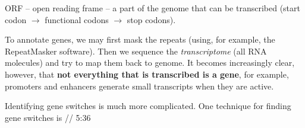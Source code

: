 \documentclass[main.tex]{subfiles}
\begin{document}
\begin{leftbar}
    ORF -- open reading frame -- a part of the genome that can be transcribed (start codon $ \rightarrow $ functional codons $ \rightarrow $ stop codons).
\end{leftbar}

To annotate genes, we may first mask the repeats (using, for example, the RepeatMasker software).
Then we sequence the \emph{transcriptome} (all RNA molecules) and try to map them back to genome. It becomes increasingly clear, however, that \textbf{not everything that is transcribed is a gene}, for example, promoters and enhancers generate small transcripts when they are active.

Identifying gene switches is much more complicated.
One technique for finding gene switches is // 5:36
\end{document}
